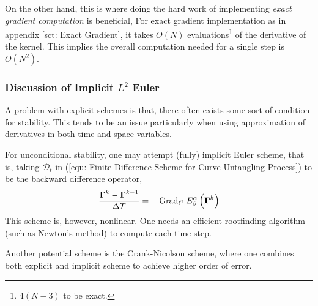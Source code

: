 \documentclass[../dissertation.tex]{subfiles}
\begin{document}
On the other hand, this is where doing the hard work of implementing \textit{exact gradient computation} is beneficial,
For exact gradient implementation as in appendix \ref{sct: Exact Gradient},
it takes $O \left( N \right)$ evaluations\footnote{$4 \left( N-3 \right)$ to be exact.} of the derivative of the kernel.
This implies the overall computation needed for a single step is $O \left( N^2 \right)$.

\subsubsection{Discussion of Implicit $L^2$ Euler}
A problem with explicit schemes is that, there often exists some sort of condition for stability.
This tends to be an issue particularly when using approximation of derivatives in both time and space variables.

For unconditional stability, one may attempt (fully) implicit Euler scheme, that is,
taking $\mathcal{D}_t$ in (\ref{equ: Finite Difference Scheme for Curve Untangling Process}) to be the backward difference operator,
\begin{equation}
    \frac{\boldsymbol{\Gamma}^{k} - \boldsymbol{\Gamma}^{k-1}}{\Delta T} = -\operatorname{Grad}_{\ell^2} E_{\beta}^{\alpha} \left( \boldsymbol{\Gamma}^k \right)
\end{equation}
This scheme is, however, nonlinear.
One needs an efficient rootfinding algorithm (such as Newton's method) to compute each time step.

Another potential scheme is the Crank-Nicolson scheme,
where one combines both explicit and implicit scheme to achieve higher order of error.
\end{document}
